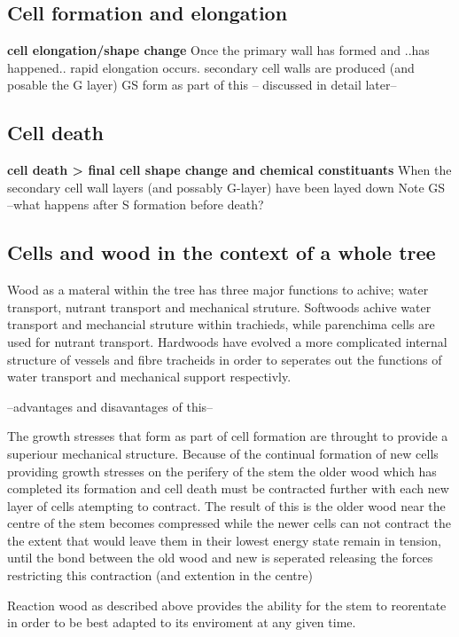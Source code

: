 \documentclass{article}
\begin{document}
\subsection{Cell formation and elongation}

\textbf{cell elongation/shape change}
Once the primary wall has formed and ..has happened.. rapid elongation occurs.
secondary cell walls are produced (and posable the G layer)
GS form as part of this -- discussed in detail later--
\subsection{Cell death}
\textbf{cell death > final cell shape change and chemical constituants}
When the secondary cell wall layers (and possably G-layer) have been layed down
 Note GS
--what happens after S formation before death?


\subsection{Cells and wood in the context of a whole tree}
Wood as a materal within the tree has three major functions to achive; water
transport, nutrant transport and mechanical struture. Softwoods achive
water transport and mechancial struture within trachieds, while parenchima cells
are used for nutrant transport. Hardwoods have evolved a more complicated
internal structure of vessels and fibre tracheids in order to seperates out the
functions of water transport and mechanical support respectivly.

--advantages and disavantages of this--

The growth stresses that form as part of cell formation are throught to provide
a superiour mechanical structure. Because of the continual formation of new
cells providing growth stresses on the perifery of the stem the older wood which
has completed its formation and cell death must be contracted further with each
new layer of cells atempting to contract. The result of this is the older wood
near the centre of the stem becomes compressed while the newer cells can not
contract the the extent that would leave them in their lowest energy state
remain in tension, until the bond between the old wood and new is seperated
releasing the forces restricting this contraction (and extention in the centre)

Reaction wood as described above provides the ability for the stem to reorentate
in order to be best adapted to its enviroment at any given time.
\end{document}
